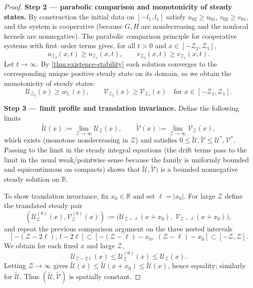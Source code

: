 \documentclass[a4paper,11pt]{amsart}
\theoremstyle{definition}
\numberwithin{equation}{section}
\theoremstyle{definition}
\begin{document}
\begin{proof}
\medskip\noindent\textbf{Step 2 — parabolic comparison and monotonicity of steady states.}
By construction the initial data on \([-l_1,l_1]\) satisfy \(u_{02}\geq u_{01}\), \(v_{02}\geq v_{01}\), and the system is cooperative (because \(G,H\) are nondecreasing and the nonlocal kernels are nonnegative). The parabolic comparison principle for cooperative systems with first–order terms  gives, for all \(t>0\) and \(x\in[-\mathcal{Z}_1,\mathcal{Z}_1]\),
\[
u_{\mathcal{Z}_2}(x,t)\ge u_{\mathcal{Z}_1}(x,t),\qquad v_{\mathcal{Z}_2}(x,t) \geq v_{\mathcal{Z}_1}(x,t).
\]
Let \(t\to\infty\). By \eqref{thm:existence-stability} each solution converges to the corresponding unique positive steady state on its domain, so we obtain the monotonicity of steady states:
\[
\mathscr{U}_{\mathcal{Z}_2}(x)\geq w_{l_1}(x),\qquad \mathscr{V}_{\mathcal{Z}_2}(x)\geq \mathscr{V}_{\mathcal Z_1}(x)
\quad\text{for }x\in[-\mathcal Z_1, \mathcal Z_1].
\]

\medskip\noindent\textbf{Step 3 — limit profile and translation invariance.}
Define the following limits
\[
\tilde {\mathscr{U}}(x):=\lim_{\mathcal Z\to\infty} \mathscr{U}_{\mathcal Z}(x),\qquad \tilde {\mathscr{V}}(x):=\lim_{ \mathcal Z\to\infty} \mathscr{V}_{\mathcal Z}(x),
\]
which exists (monotone nondecreasing in \(\mathcal{Z}\)) and satisfies \(0\leq \tilde{\mathscr{U}} ,\tilde{\mathscr{V}}  \leq \mathscr{U}^\ast, \mathscr{V}^\ast\). Passing to the limit in the steady integral equations (the drift terms pass to the limit in the usual weak/pointwise sense because the family is uniformly bounded and equicontinuous on compacts) shows that \(\tilde {\mathscr{U}}, \tilde{\mathscr{V}} )\) is a bounded nonnegative steady solution on \(\mathbb R\).

To show translation invariance, fix \(x_0\in\mathbb R\) and set \(\ell=|x_0|\). For large \(\mathcal Z\) define the translated steady pair
\[
(\mathscr U^{(0)}_{\mathcal Z}(x), \mathscr V^{(0)}_{\mathcal Z}(x)):=\big(\mathscr U_{\mathcal Z-\ell}(x+x_0),\; \mathscr V_{\mathcal Z-\ell}(x+x_0)\big),
\]
and repeat the previous comparison argument on the three nested intervals
\[
[-(\mathcal Z-2\ell),\,l-2\ell]\subset [-(\mathcal Z-\ell)-x_0,\; (\mathcal Z-\ell)-x_0]\subset[-\mathcal Z, \mathcal Z].
\]
We obtain for each fixed \(x\) and large \(\mathcal Z\),
\[
\mathscr U_{\mathcal{Z}-2\ell}(x)\leq \mathscr U^{(0)}_{\mathcal{Z}}(x)\leq \mathscr U_\mathcal{Z}(x).
\]
Letting \(\mathcal{Z}\to\infty\) gives \(\tilde{\mathscr{U}}  (x)\leq \tilde{\mathscr{U}}(x+x_0)\leq \tilde{\mathscr{U}}(x)\), hence equality; similarly for \(\tilde{\mathscr{U}}\). Thus \((\tilde{\mathscr{U}},\tilde{\mathscr{V}})\) is spatially constant.


\end{proof}
\end{document}
